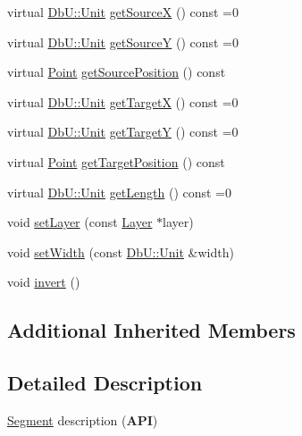 \begin{DoxyCompactItemize}
\item 
virtual \hyperlink{group__DbUGroup_ga4fbfa3e8c89347af76c9628ea06c4146}{Db\+U\+::\+Unit} \hyperlink{classHurricane_1_1Segment_a0347e3bde8e2e90b05cffdaf2d048710}{get\+SourceX} () const =0
\item 
virtual \hyperlink{group__DbUGroup_ga4fbfa3e8c89347af76c9628ea06c4146}{Db\+U\+::\+Unit} \hyperlink{classHurricane_1_1Segment_abf305dd4510de6fe6fae5286acbe285a}{get\+SourceY} () const =0
\item 
virtual \hyperlink{classHurricane_1_1Point}{Point} \hyperlink{classHurricane_1_1Segment_a41c4b88c35b9af0ad741205d0a8ea9c2}{get\+Source\+Position} () const
\item 
virtual \hyperlink{group__DbUGroup_ga4fbfa3e8c89347af76c9628ea06c4146}{Db\+U\+::\+Unit} \hyperlink{classHurricane_1_1Segment_abba6713e109a0925c078a9785274f389}{get\+TargetX} () const =0
\item 
virtual \hyperlink{group__DbUGroup_ga4fbfa3e8c89347af76c9628ea06c4146}{Db\+U\+::\+Unit} \hyperlink{classHurricane_1_1Segment_a27d530abcff9742b81c4b549db161b90}{get\+TargetY} () const =0
\item 
virtual \hyperlink{classHurricane_1_1Point}{Point} \hyperlink{classHurricane_1_1Segment_af24bee306be3461bb5dd1ba680f2a2df}{get\+Target\+Position} () const
\item 
virtual \hyperlink{group__DbUGroup_ga4fbfa3e8c89347af76c9628ea06c4146}{Db\+U\+::\+Unit} \hyperlink{classHurricane_1_1Segment_a9f6c42c2de0330aa6a486cdbf550cea1}{get\+Length} () const =0
\item 
void \hyperlink{classHurricane_1_1Segment_acd0b0cd25c824ba7f3b1ff2776c97cf1}{set\+Layer} (const \hyperlink{classHurricane_1_1Layer}{Layer} $\ast$layer)
\item 
void \hyperlink{classHurricane_1_1Segment_aec203d5d3aa96150979ba532d4bd1c7d}{set\+Width} (const \hyperlink{group__DbUGroup_ga4fbfa3e8c89347af76c9628ea06c4146}{Db\+U\+::\+Unit} \&width)
\item 
void \hyperlink{classHurricane_1_1Segment_aceaa61242eb7275cf9c6a39cf1868c53}{invert} ()
\end{DoxyCompactItemize}
\subsection*{Additional Inherited Members}


\subsection{Detailed Description}
\hyperlink{classHurricane_1_1Segment}{Segment} description ({\bfseries A\+PI}) 

